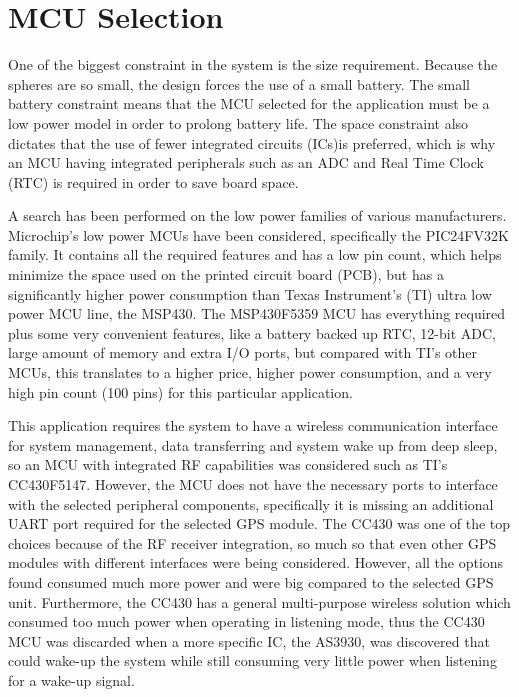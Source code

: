 \section{MCU Selection}
One of the biggest constraint in the system is the size requirement.  Because the spheres are so small, the design forces the use of a small battery. The small battery constraint means that the MCU selected for the application must be a low power model in order to prolong battery life. The space constraint also dictates that the use of fewer integrated circuits (ICs)is preferred, which is why an MCU having integrated peripherals such as an ADC and Real Time Clock (RTC) is required in order to save board space. 

A search has been performed on the low power families of various manufacturers. Microchip's low power MCUs have been considered, specifically the PIC24FV32K family. It contains all the required features and has a low pin count, which helps minimize the space used on the printed circuit board (PCB), but has a significantly higher power consumption than Texas Instrument's (TI) ultra low power MCU line, the MSP430. The MSP430F5359 MCU has everything required plus some very convenient features, like a battery backed up RTC, 12-bit ADC, large amount of memory and extra I/O ports, but compared with TI's other MCUs, this translates to a higher price, higher power consumption, and a very high pin count (100 pins) for this particular application. 

This application requires the system to have a wireless communication interface for system management, data transferring and system wake up from deep sleep, so an MCU with integrated RF capabilities was considered such as TI's CC430F5147. However, the MCU does not have the necessary ports to interface with the selected peripheral components, specifically it is missing an additional UART port required for the selected GPS module. The CC430 was one of the top choices because of the RF receiver integration, so much so that even other GPS modules with different interfaces were being considered. However, all the options found consumed much more power and were big compared to the selected GPS unit.  Furthermore, the CC430 has a general multi-purpose wireless solution which consumed too much power when operating in listening mode, thus the CC430 MCU was discarded when a more specific IC, the AS3930, was discovered that could wake-up the system while still consuming very little power when listening for a wake-up signal. 


